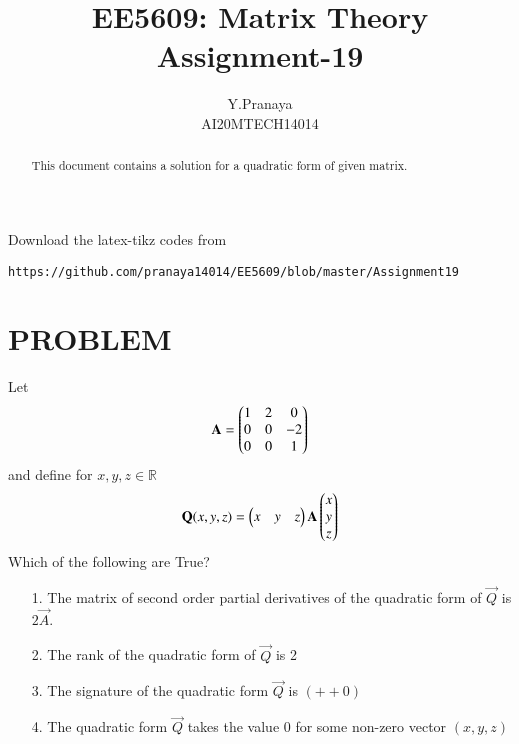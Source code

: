 \documentclass[journal,12pt]{IEEEtran}
\begin{document}
     \def\rightbox#1{\makebox[0in][r]{#1}}
     \def\centbox#1{\makebox[0in]{#1}}
     \def\topbox#1{\raisebox{-\baselineskip}[0in][0in]{#1}}
     \def\midbox#1{\raisebox{-0.5\baselineskip}[0in][0in]{#1}}
\vspace{3cm}
\title{EE5609: Matrix Theory\\
          Assignment-19\\}
\author{Y.Pranaya\\
AI20MTECH14014 }
\maketitle
\bigskip
\renewcommand{\thefigure}{\theenumi}
\renewcommand{\thetable}{\theenumi}
\renewcommand{\theequation}{\arabic{equation}}
\begin{abstract}
This document contains a solution for a quadratic form of given matrix.
\end{abstract}
Download the latex-tikz codes from 

%
\begin{lstlisting}
https://github.com/pranaya14014/EE5609/blob/master/Assignment19
\end{lstlisting}
%

\section{PROBLEM}
Let
\begin{align}
\mathbf{A} = \begin{pmatrix}1&2&0\\0&0&-2\\0&0&1\end{pmatrix}
\end{align}
and define for $x,y,z \in \mathbb{R}$
\begin{align}
\mathbf{Q}(x,y,z)= \begin{pmatrix}x&y&z\end{pmatrix}\mathbf{A}\begin{pmatrix}x\\y\\z\end{pmatrix}
\end{align}
Which of the following are True?
\begin{enumerate}
\item[1.] The matrix of second order partial derivatives of the quadratic form of $\vec{Q}$ is $2\vec{A}$.
\item[2.] The rank of the quadratic form of $\vec{Q}$ is 2
\item[3.] The signature of the quadratic form $\vec{Q}$ is $(++0)$
\item[4.] The quadratic form $\vec{Q}$ takes the value 0 for some non-zero vector $(x,y,z)$
\end{enumerate}
\end{document}
